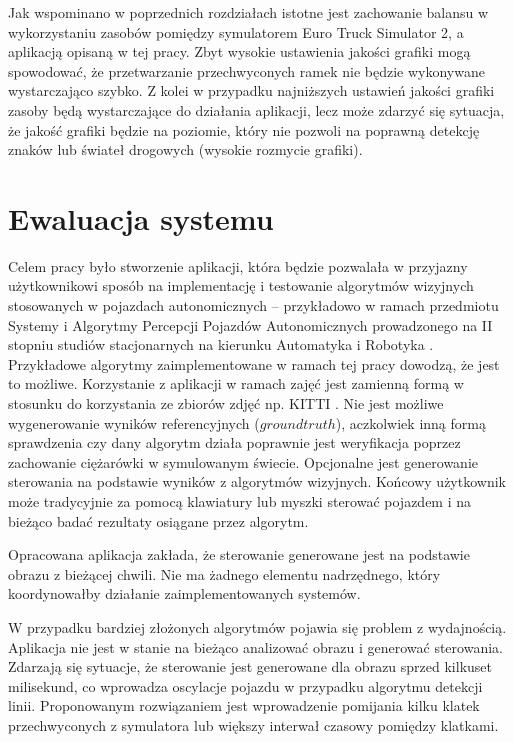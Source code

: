Jak wspominano w poprzednich rozdziałach istotne jest zachowanie balansu w wykorzystaniu zasobów pomiędzy symulatorem Euro Truck Simulator 2, a aplikacją opisaną w tej pracy. 
Zbyt wysokie ustawienia jakości grafiki mogą spowodować, że przetwarzanie przechwyconych ramek nie będzie wykonywane wystarczająco szybko. 
Z kolei w przypadku najniższych ustawień jakości grafiki zasoby będą wystarczające do działania aplikacji, lecz może zdarzyć się sytuacja, że jakość grafiki będzie na poziomie, który nie pozwoli na poprawną detekcję znaków lub świateł drogowych (wysokie rozmycie grafiki).

\section{Ewaluacja systemu}

Celem pracy było stworzenie aplikacji, która będzie pozwalała w przyjazny użytkownikowi sposób na implementację i testowanie algorytmów wizyjnych stosowanych w pojazdach autonomicznych -- przykładowo w ramach przedmiotu Systemy i Algorytmy Percepcji Pojazdów Autonomicznych prowadzonego na II stopniu studiów stacjonarnych na kierunku Automatyka i Robotyka . 
Przykładowe algorytmy zaimplementowane w ramach tej pracy dowodzą, że jest to możliwe. 
Korzystanie z aplikacji w ramach zajęć jest zamienną formą w stosunku do korzystania ze zbiorów zdjęć np. KITTI \cite{W6}. 
Nie jest możliwe wygenerowanie wyników referencyjnych ($ground truth$), aczkolwiek inną formą sprawdzenia czy dany algorytm działa poprawnie jest weryfikacja poprzez zachowanie ciężarówki w symulowanym świecie. 
Opcjonalne jest generowanie sterowania na podstawie wyników z algorytmów wizyjnych. 
Końcowy użytkownik może tradycyjnie za pomocą klawiatury lub myszki sterować pojazdem i na bieżąco badać rezultaty osiągane przez algorytm.

Opracowana aplikacja zakłada, że sterowanie generowane jest na podstawie obrazu z bieżącej chwili. Nie ma żadnego elementu nadrzędnego, który koordynowałby działanie zaimplementowanych systemów.

W przypadku bardziej złożonych algorytmów pojawia się problem z wydajnością. 
Aplikacja nie jest w stanie na bieżąco analizować obrazu i generować sterowania. 
Zdarzają się sytuacje, że sterowanie jest generowane dla obrazu sprzed kilkuset milisekund, co wprowadza oscylacje pojazdu w przypadku algorytmu detekcji linii.
Proponowanym rozwiązaniem jest wprowadzenie pomijania kilku klatek przechwyconych z symulatora lub większy interwał czasowy pomiędzy klatkami.

